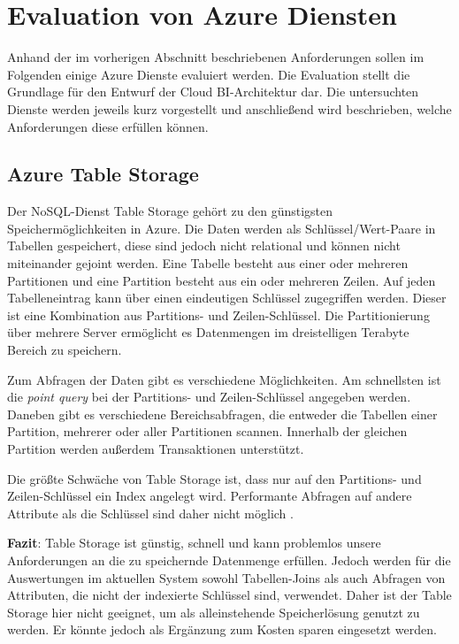 \section{Evaluation von Azure Diensten} \label{sec:evaluation}
Anhand der im vorherigen Abschnitt beschriebenen Anforderungen sollen im Folgenden einige Azure Dienste evaluiert werden. Die Evaluation stellt die Grundlage für den Entwurf der Cloud BI-Architektur dar. Die untersuchten Dienste werden jeweils kurz vorgestellt und anschließend wird beschrieben, welche Anforderungen diese erfüllen können.

\subsection{Azure Table Storage} \label{sec:grundlagen:azure_dienste:tableStorage}
Der NoSQL-Dienst Table Storage gehört zu den günstigsten Speichermöglichkeiten in Azure. Die Daten werden als Schlüssel/Wert-Paare in Tabellen gespeichert, diese sind jedoch nicht relational und können nicht miteinander gejoint werden. Eine Tabelle besteht aus einer oder mehreren Partitionen und eine Partition besteht aus ein oder mehreren Zeilen. Auf jeden Tabelleneintrag kann über einen eindeutigen Schlüssel zugegriffen werden. Dieser ist eine Kombination aus Partitions- und Zeilen-Schlüssel. Die Partitionierung über mehrere Server ermöglicht es Datenmengen im dreistelligen Terabyte Bereich zu speichern.

Zum Abfragen der Daten gibt es verschiedene Möglichkeiten. Am schnellsten ist die \textit{point query} bei der Partitions- und Zeilen-Schlüssel angegeben werden. Daneben gibt es verschiedene Bereichsabfragen, die entweder die Tabellen einer Partition, mehrerer oder aller Partitionen scannen. Innerhalb der gleichen Partition werden außerdem Transaktionen unterstützt. 

Die größte Schwäche von Table Storage ist, dass nur auf den Partitions- und Zeilen-Schlüssel ein Index angelegt wird. Performante Abfragen auf andere Attribute als die Schlüssel sind daher nicht möglich \cite{reagan_azure_2018}.

\textbf{Fazit}: Table Storage ist günstig, schnell und kann problemlos unsere Anforderungen an die zu speichernde Datenmenge erfüllen. Jedoch werden für die Auswertungen im aktuellen System sowohl Tabellen-Joins als auch Abfragen von Attributen, die nicht der indexierte Schlüssel sind, verwendet. Daher ist der Table Storage hier nicht geeignet, um als alleinstehende Speicherlösung genutzt zu werden. Er könnte jedoch als Ergänzung zum Kosten sparen eingesetzt werden. \cite[vgl.][]{reagan_azure_2018}

